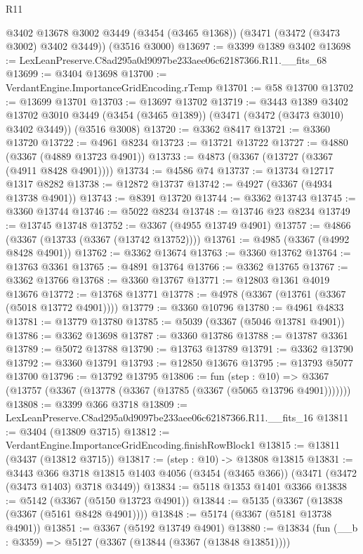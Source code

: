 \begin{lexlean}{R11}
\begin{coremodule}
    @3402
    @13678
    @3002
    @3449
    (@3454 (@3465 @1368))
    (@3471 (@3472 (@3473 @3002) @3402 @3449))
    (@3516 @3000)
@13697 := @3399 @1389 @3402
@13698 := LexLeanPreserve.C8ad295a0d9097be233aee06c62187366.R11.__fits_68
@13699 := @3404 @13698
@13700 := VerdantEngine.ImportanceGridEncoding.rTemp
@13701 := @58 @13700
@13702 := @13699 @13701
@13703 := @13697 @13702
@13719 := @3443
    @1389
    @3402
    @13702
    @3010
    @3449
    (@3454 (@3465 @1389))
    (@3471 (@3472 (@3473 @3010) @3402 @3449))
    (@3516 @3008)
@13720 := @3362 @8417
@13721 := @3360 @13720
@13722 := @4961 @8234
@13723 := @13721 @13722
@13727 := @4880 (@3367 (@4889 @13723 @4901))
@13733 := @4873 (@3367 (@13727 (@3367 (@4911 @8428 @4901))))
@13734 := @4586 @74
@13737 := @13734 @12717 @1317 @8282
@13738 := @12872 @13737
@13742 := @4927 (@3367 (@4934 @13738 @4901))
@13743 := @8391 @13720
@13744 := @3362 @13743
@13745 := @3360 @13744
@13746 := @5022 @8234
@13748 := @13746 @23 @8234
@13749 := @13745 @13748
@13752 := @3367 (@4955 @13749 @4901)
@13757 := @4866 (@3367 (@13733 (@3367 (@13742 @13752))))
@13761 := @4985 (@3367 (@4992 @8428 @4901))
@13762 := @3362 @13674
@13763 := @3360 @13762
@13764 := @13763 @3361
@13765 := @4891 @13764
@13766 := @3362 @13765
@13767 := @3362 @13766
@13768 := @3360 @13767
@13771 := @12803 @1361 @4019 @13676
@13772 := @13768 @13771
@13778 := @4978 (@3367 (@13761 (@3367 (@5018 @13772 @4901))))
@13779 := @3360 @10796
@13780 := @4961 @4833
@13781 := @13779 @13780
@13785 := @5039 (@3367 (@5046 @13781 @4901))
@13786 := @3362 @13698
@13787 := @3360 @13786
@13788 := @13787 @3361
@13789 := @5072 @13788
@13790 := @13763 @13789
@13791 := @3362 @13790
@13792 := @3360 @13791
@13793 := @12850 @13676
@13795 := @13793 @5077 @13700
@13796 := @13792 @13795
@13806 := fun (step : @10) =>
  @3367 (@13757 (@3367 (@13778 (@3367 (@13785 (@3367 (@5065 @13796 @4901)))))))
@13808 := @3399 @366 @3718
@13809 := LexLeanPreserve.C8ad295a0d9097be233aee06c62187366.R11.__fits_16
@13811 := @3404 (@13809 @3715)
@13812 := VerdantEngine.ImportanceGridEncoding.finishRowBlock1
@13815 := @13811 (@3437 (@13812 @3715))
@13817 := (step : @10) -> @13808 @13815
@13831 := @3443
    @366
    @3718
    @13815
    @1403
    @4056
    (@3454 (@3465 @366))
    (@3471 (@3472 (@3473 @1403) @3718 @3449))
@13834 := @5118 @1353 @1401 @3366
@13838 := @5142 (@3367 (@5150 @13723 @4901))
@13844 := @5135 (@3367 (@13838 (@3367 (@5161 @8428 @4901))))
@13848 := @5174 (@3367 (@5181 @13738 @4901))
@13851 := @3367 (@5192 @13749 @4901)
@13880 := @13834
    (fun (__b : @3359) =>
    @5127
      (@3367 (@13844 (@3367 (@13848 @13851))))

\end{coremodule}
\end{lexlean}

